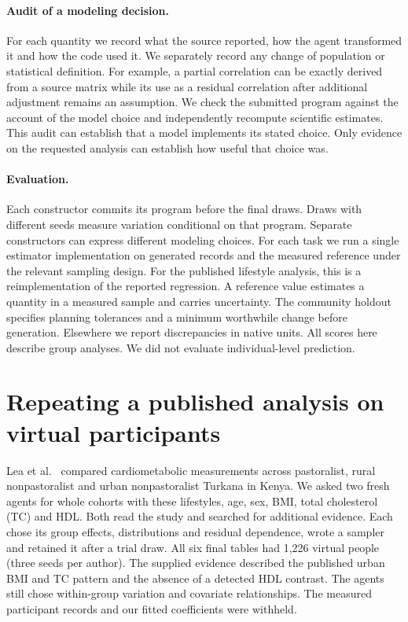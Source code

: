 \documentclass[sigconf,anonymous,review]{acmart}
\begin{document}
\paragraph{Audit of a modeling decision.}
For each quantity we record what the source reported, how the agent transformed it and how the code used it. We separately record any change of population or statistical definition. For example, a partial correlation can be exactly derived from a source matrix while its use as a residual correlation after additional adjustment remains an assumption. We check the submitted program against the account of the model choice and independently recompute scientific estimates. This audit can establish that a model implements its stated choice. Only evidence on the requested analysis can establish how useful that choice was.

\paragraph{Evaluation.}
Each constructor commits its program before the final draws. Draws with different seeds measure variation conditional on that program. Separate constructors can express different modeling choices. For each task we run a single estimator implementation on generated records and the measured reference under the relevant sampling design. For the published lifestyle analysis, this is a reimplementation of the reported regression. A reference value estimates a quantity in a measured sample and carries uncertainty. The community holdout specifies planning tolerances and a minimum worthwhile change before generation. Elsewhere we report discrepancies in native units. All scores here describe group analyses. We did not evaluate individual-level prediction.

\section{Repeating a published analysis on virtual participants}
\label{sec:lifestyle}
Lea et al.~\cite{lea,leadata} compared cardiometabolic measurements across pastoralist, rural nonpastoralist and urban nonpastoralist Turkana in Kenya. We asked two fresh agents for whole cohorts with these lifestyles, age, sex, BMI, total cholesterol (TC) and HDL. Both read the study and searched for additional evidence. Each chose its group effects, distributions and residual dependence, wrote a sampler and retained it after a trial draw. All six final tables had 1,226 virtual people (three seeds per author). The supplied evidence described the published urban BMI and TC pattern and the absence of a detected HDL contrast. The agents still chose within-group variation and covariate relationships. The measured participant records and our fitted coefficients were withheld.
\end{document}
